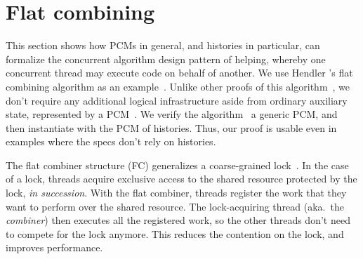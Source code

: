 \section{Flat combining}
\label{sec:flatco}

This section shows how PCMs in general, and histories in particular,
can formalize the concurrent algorithm design pattern of helping,
whereby one concurrent thread may execute code on behalf of
another. We use Hendler \etal's flat combining algorithm as an
example~\cite{Hendler-al:SPAA10}.  Unlike other proofs of this
algorithm~\cite{Cerone-al:ICALP14,Turon-al:ICFP13}, we don't require
any additional logical infrastructure aside from ordinary auxiliary
state, represented by a
PCM~\cite{LeyWild-Nanevski:POPL13,Nanevski-al:ESOP14}.
%
%
We verify the algorithm \wrt~a generic PCM, and then instantiate with
the PCM of histories. Thus, our proof is usable even in examples where
the specs don't rely on histories. 

The flat combiner structure (FC) generalizes a coarse-grained
lock~\cite{Owicki-Gries:CACM76,Nanevski-al:ESOP14,OHearn:TCS07}. In
the case of a lock, threads acquire exclusive access to the shared
resource protected by the lock, \emph{in succession}. With the flat
combiner, threads register the work that they want to perform over the
shared resource. The lock-acquiring thread (aka.~the \emph{combiner})
then executes all the registered work, so the other threads don't need
to compete for the lock anymore. This reduces the contention on the
lock, and improves performance.


